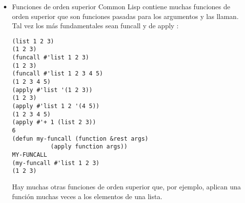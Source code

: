 \documentclass[11pt]{article}
\begin{document}
\begin{itemize}
\begin{itemize}
\begin{verbatim}
(coerce '(lambda (x) x) 'function)
#<anonymous interpreted function 4060000A7C>

(eval '(lambda (x) x))
#<anonymous interpreted function 4060000B9C>

(compile nil '(lambda (x) x))
#<Function 17 4060000CCC>

\end{verbatim}

Haciendo referencia a las funciones existentes Cualquier símbolo en
Common Lisp tiene una ranura para una variable a vincular y una ranura
separada para una función a vincular.

Se tiene que tener  en cuenta que la denominación en este ejemplo es solo para
ilustración. Las variables globales no deberían llamarse foo , sino
\textbf{foo} . La última notación es una convención para dejar en claro que
la variable es una variable especial que utiliza el enlace dinámico .
\begin{verbatim}
(boundp 'foo) ;is FOO defined as a variable?
NIL
(defvar foo 7)
FOO
(boundp 'foo)
T
foo
7
(symbol-value 'foo)
7
(fboundp 'foo) ;is FOO defined as a function?
NIL
 (defun foo (x y) (+ (* x x) (* y y)))
FOO
 (fboundp 'foo)
T
 foo
7
(symbol-function 'foo)
#<FUNCTION FOO>
(function foo)
#<FUNCTION FOO>
(equalp (quote #'foo) (quote (function foo)))
T
(eq (symbol-function 'foo) #'foo)
T
(foo 4 3)
25
(funcall foo 4 3)
;get an error: 7 is not a function
(funcall #'foo 4 3)
25
(defvar bar #'foo)
BAR
bar
#<FUNCTION FOO>
(funcall bar 4 3)
25
#'+
#<FUNCTION +>
(funcall #'+ 2 3)
5
\end{verbatim}
\end{itemize}


\item Funciones de orden superior
\label{sec:orgf44d405}
Common Lisp contiene muchas funciones de orden superior que son
funciones pasadas para los argumentos y las llaman. Tal vez los más
fundamentales sean funcall y de apply :

\begin{verbatim}
(list 1 2 3)
(1 2 3)
(funcall #'list 1 2 3)
(1 2 3)
(funcall #'list 1 2 3 4 5)
(1 2 3 4 5)
(apply #'list '(1 2 3))
(1 2 3)
(apply #'list 1 2 '(4 5))
(1 2 3 4 5)
(apply #'+ 1 (list 2 3))
6
(defun my-funcall (function &rest args)
           (apply function args))
MY-FUNCALL
(my-funcall #'list 1 2 3)
(1 2 3)
\end{verbatim}

Hay muchas otras funciones de orden superior que, por ejemplo, aplican
una función muchas veces a los elementos de una lista.


\end{itemize}
\end{document}
